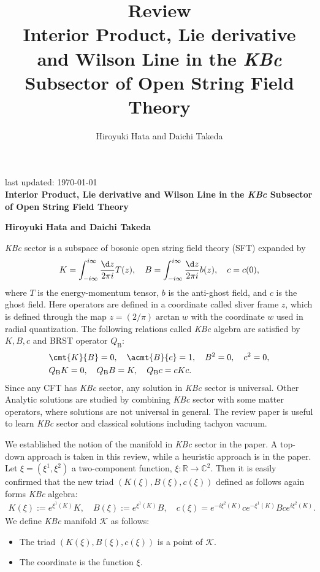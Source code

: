 \documentclass[12pt]{article}
\title{\textbf{Review}\\
Interior Product, Lie derivative and Wilson Line in the \textit{KBc} Subsector of Open String Field Theory
}
\author{Hiroyuki Hata and Daichi Takeda}
\date{}
\renewcommand{\thefootnote}{\fnsymbol{footnote}}
\begin{document}
{\Large{}
\hfill{\normalsize last updated: \today}
\\[2mm]
\textbf{Interior Product, Lie derivative and Wilson Line in the \textit{KBc} Subsector of Open String Field Theory
}
}

\noindent
\hfill\textbf{Hiroyuki Hata and Daichi Takeda}

\renewcommand{\thefootnote}{\arabic{footnote})}
\setcounter{footnote}{0}
\vspace{12pt}
\textit{KBc} sector is a subspace of bosonic open string field theory (SFT) expanded by
\begin{align}
	K = \int_{-i\infty}^{i\infty}\frac{\d z}{2\pi i}T(z),\quad
	B =  \int_{-i\infty}^{i\infty}\frac{\d z}{2\pi i}b(z),\quad 
	c = c(0),
\end{align}
where $T$ is the energy-momentum tensor, $b$ is the anti-ghost field, and $c$ is the ghost field.
Here operators are defined in a coordinate called sliver frame $z$, 
which is defined through the map $z = (2/\pi)\arctan w$ with the coordinate $w$ used in radial quantization.
The following relations called \textit{KBc} algebra are satisfied by $K,B,c$ and BRST operator $Q_\mathrm{B}$:
\begin{align}
	&\cmt{K}{B} = 0,\quad
	\acmt{B}{c} = 1,\quad
	B^2 = 0,\quad
	c^2 = 0,\\
	&Q_\mathrm{B}K = 0,\quad
	Q_\mathrm{B}B = K,\quad
	Q_\mathrm{B}c = cKc.
\end{align}
Since any CFT has \textit{KBc} sector, any solution in \textit{KBc} sector is universal.
Other Analytic solutions are studied by combining \textit{KBc} sector with some matter operators,
where solutions are not universal in general.
The review paper \cite{Okawa:2012ica} is useful to learn \textit{KBc} sector and classical solutions including tachyon vacuum.

We established the notion of the manifold in \textit{KBc} sector in the paper.
A top-down approach is taken in this review, while a heuristic approach is in the paper.
Let $\xi = (\xi^1,\xi^2)$ a two-component function, $\xi:\mathbb R\to \mathbb C^2$.
Then it is easily confirmed that the new triad $(K(\xi),B(\xi),c(\xi))$ defined as follows again forms \textit{KBc} algebra:
\begin{align}
	K(\xi) := e^{\xi^1(K)}K,\quad B(\xi) := e^{\xi^1(K)}B,\quad c(\xi) = e^{-i\xi^2(K)}ce^{-\xi^1(K)}Bce^{i\xi^2(K)}.
\end{align}
We define \textit{KBc} manifold $\mathcal K$ as follows:
\begin{itemize}
	\item The triad $(K(\xi),B(\xi),c(\xi))$ is a point of $\mathcal K$.
	\item The coordinate is the function $\xi$.
\end{itemize}
\end{document}
